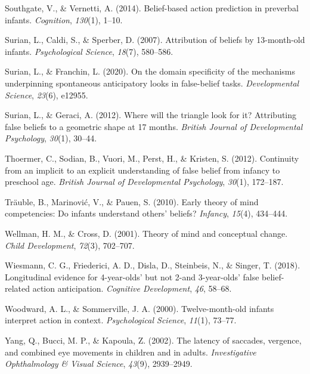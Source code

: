 \documentclass[
  man,floatsintext]{apa6}
\newlength{\cslhangindent}
\newenvironment{CSLReferences}[2] %
 {\begin{list}{}{%
  \setlength{\itemindent}{0pt}
  \setlength{\leftmargin}{0pt}
  \setlength{\parsep}{0pt}
  \ifodd #1
   \setlength{\leftmargin}{\cslhangindent}
   \setlength{\itemindent}{-1\cslhangindent}
  \fi
  \setlength{\itemsep}{#2\baselineskip}}}
 {\end{list}}
\begin{document}
\begin{CSLReferences}{1}{0}
Southgate, V., \& Vernetti, A. (2014). Belief-based action prediction in preverbal infants. \emph{Cognition}, \emph{130}(1), 1--10.

Surian, L., Caldi, S., \& Sperber, D. (2007). Attribution of beliefs by 13-month-old infants. \emph{Psychological Science}, \emph{18}(7), 580--586.

Surian, L., \& Franchin, L. (2020). On the domain specificity of the mechanisms underpinning spontaneous anticipatory looks in false-belief tasks. \emph{Developmental Science}, \emph{23}(6), e12955.

Surian, L., \& Geraci, A. (2012). Where will the triangle look for it? Attributing false beliefs to a geometric shape at 17 months. \emph{British Journal of Developmental Psychology}, \emph{30}(1), 30--44.

Thoermer, C., Sodian, B., Vuori, M., Perst, H., \& Kristen, S. (2012). Continuity from an implicit to an explicit understanding of false belief from infancy to preschool age. \emph{British Journal of Developmental Psychology}, \emph{30}(1), 172--187.

Träuble, B., Marinović, V., \& Pauen, S. (2010). Early theory of mind competencies: Do infants understand others' beliefs? \emph{Infancy}, \emph{15}(4), 434--444.

Wellman, H. M., \& Cross, D. (2001). Theory of mind and conceptual change. \emph{Child Development}, \emph{72}(3), 702--707.

Wiesmann, C. G., Friederici, A. D., Disla, D., Steinbeis, N., \& Singer, T. (2018). Longitudinal evidence for 4-year-olds' but not 2-and 3-year-olds' false belief-related action anticipation. \emph{Cognitive Development}, \emph{46}, 58--68.

Woodward, A. L., \& Sommerville, J. A. (2000). Twelve-month-old infants interpret action in context. \emph{Psychological Science}, \emph{11}(1), 73--77.

Yang, Q., Bucci, M. P., \& Kapoula, Z. (2002). The latency of saccades, vergence, and combined eye movements in children and in adults. \emph{Investigative Ophthalmology \& Visual Science}, \emph{43}(9), 2939--2949.

\end{CSLReferences}

\endgroup
\end{document}
